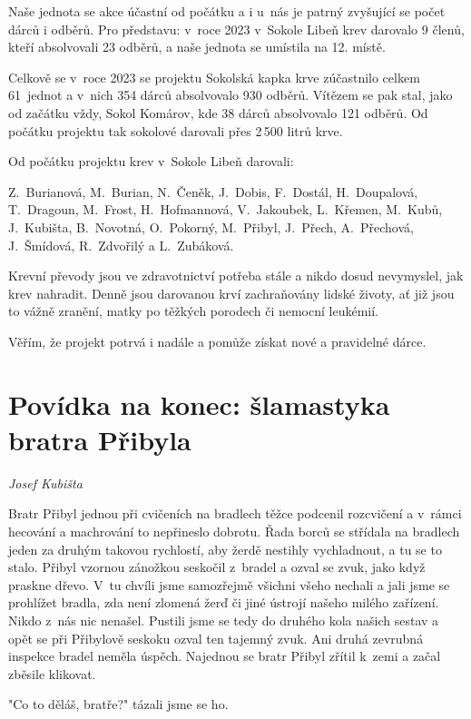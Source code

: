 \documentclass[a5paper, 11pt, twoside]{article}
\begin{document}
Naše jednota se akce účastní od počátku a i u~nás je patrný zvyšující se
počet dárců i odběrů. Pro představu: v~roce 2023 v~Sokole Libeň krev
darovalo 9 členů, kteří absolvovali 23 odběrů, a naše jednota se
umístila na 12. místě.

Celkově se v~roce 2023 se projektu Sokolská kapka krve zúčastnilo celkem
61~jednot a v~nich 354 dárců absolvovalo 930 odběrů. Vítězem se pak
stal, jako od začátku vždy, Sokol Komárov, kde 38 dárců absolvovalo 121
odběrů. Od počátku projektu tak sokolové darovali přes 2\,500 litrů krve.

Od počátku projektu krev v~Sokole Libeň darovali:

Z.~Burianová, M.~Burian, N.~Čeněk, J.~Dobis, F.~Dostál, H.~Doupalová, T.~Dragoun, M.~Frost, H.~Hofmannová, V.~Jakoubek, L.~Křemen, M.~Kubů, J.~Kubišta, B.~Novotná, O.~Pokorný, M.~Přibyl, J.~Přech, A.~Přechová, J.~Šmídová, R.~Zdvořilý a L.~Zubáková.

Krevní převody jsou ve zdravotnictví potřeba stále a nikdo dosud
nevymyslel, jak krev nahradit. Denně jsou darovanou krví zachraňovány
lidské životy, ať již jsou to vážně zranění, matky po těžkých porodech
či nemocní leukémií.

Věřím, že projekt potrvá i nadále a pomůže získat nové a pravidelné
dárce.

\section{Povídka na konec: šlamastyka bratra
Přibyla}

\begin{center}
\textit{Josef Kubišta}
\end{center}

\noindent
Bratr Přibyl jednou při cvičeních na bradlech těžce podcenil rozcvičení
a v~rámci hecování a machrování to nepřineslo dobrotu. Řada borců se
střídala na bradlech jeden za druhým takovou rychlostí, aby žerdě
nestihly vychladnout, a tu se to stalo. Přibyl vzornou zánožkou seskočil
z~bradel a ozval se zvuk, jako když praskne dřevo. V~tu chvíli jsme
samozřejmě všichni všeho nechali a jali jsme se prohlížet bradla, zda
není zlomená žerď či jiné ústrojí našeho milého zařízení. Nikdo z~nás
nic nenašel. Pustili jsme se tedy do druhého kola našich sestav a opět
se při Přibylově seskoku ozval ten tajemný zvuk. Ani druhá zevrubná
inspekce bradel neměla úspěch. Najednou se bratr Přibyl zřítil k~zemi a
začal zběsile klikovat.

"Co to děláš, bratře?" tázali jsme se ho.
\end{document}
